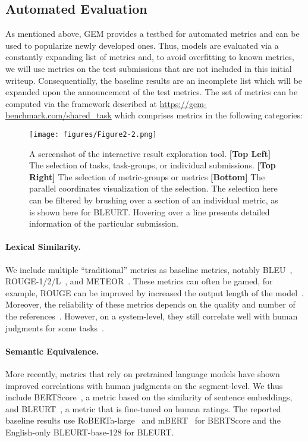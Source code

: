 \documentclass[11pt,a4paper]{article}
\newcommand{\GEM}{\textsc{GEM}}
\begin{document}
\subsection{Automated Evaluation}

As mentioned above, \GEM{} provides a testbed for automated metrics and can be used to popularize newly developed ones. Thus, models are evaluated via a constantly expanding list of metrics and, to avoid overfitting to known metrics, we will use metrics on the test submissions that are not included in this initial writeup. Consequentially, the baseline results are an incomplete list which will be expanded upon the announcement of the test metrics. 
The set of metrics can be computed via the framework described at \url{https://gem-benchmark.com/shared_task} which comprises metrics in the following categories:

\begin{figure*}[t]
\centering
\texttt{[image: figures/Figure2-2.png]}
\vspace{-1cm}
\caption[Interactive result exploration]{A screenshot of the interactive result exploration tool. \textbf{[Top Left]} The selection of tasks, task-groups, or individual submissions. \textbf{[Top Right]} The selection of metric-groups or metrics \textbf{[Bottom]} The parallel coordinates visualization of the selection. The selection here can be filtered by brushing over a section of an individual metric, as is shown here for BLEURT. Hovering over a line presents detailed information of the particular submission.}
\label{fig:results}
\end{figure*}

\paragraph{Lexical Similarity.} 
We include multiple ``traditional'' metrics as baseline metrics, notably BLEU~\citep{papineni2002bleu}, ROUGE-1/2/L~\citep{lin2004rouge}, and METEOR~\citep{banerjee2005meteor}. 
These metrics can often be gamed, for example, ROUGE can be improved by increased the output length of the model~\citep{sun2019compare}. Moreover, the reliability of these metrics depends on the quality and number of the references~\citep{mathur-2020-tangled,freitag-2020-bleu}. However, on a system-level, they still correlate well with human judgments for some tasks~\citep{reiter2018structured}.


\paragraph{Semantic Equivalence.} More recently, metrics that rely on pretrained language models have shown improved correlations with human judgments on the segment-level. We thus include BERTScore~\citep{zhang2019bertscore}, a metric based on the similarity of sentence embeddings, and BLEURT~\citep{sellam-2020-bleurt}, a metric that is fine-tuned on human ratings. The reported baseline results use RoBERTa-large~\citep{liu2019roberta} and mBERT~\citep{devlin-2019-bert} for BERTScore and the English-only BLEURT-base-128 for BLEURT.
\end{document}
